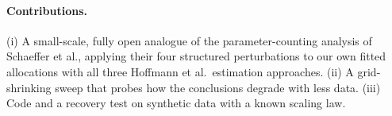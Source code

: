 \paragraph{Contributions.} (i) A small-scale, fully open analogue of the parameter-counting analysis of Schaeffer et al., applying their four structured perturbations to our own fitted allocations with all three Hoffmann et al.\ estimation approaches. (ii) A grid-shrinking sweep that probes how the conclusions degrade with less data. (iii) Code and a recovery test on synthetic data with a known scaling law. 
